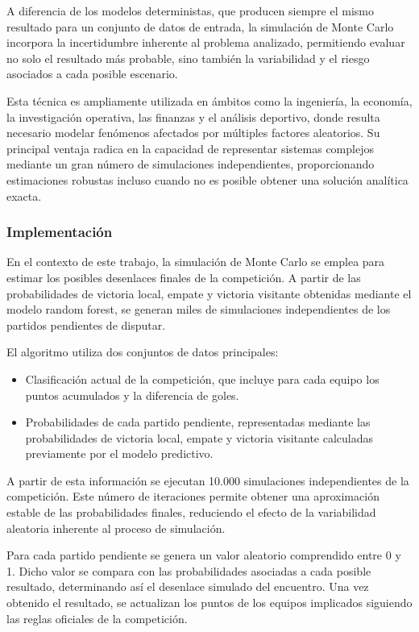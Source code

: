 A diferencia de los modelos deterministas, que producen siempre el mismo resultado para un conjunto de datos de entrada, la simulación de Monte Carlo incorpora la incertidumbre inherente al problema analizado, permitiendo evaluar no solo el resultado más probable, sino también la variabilidad y el riesgo asociados a cada posible escenario.

Esta técnica es ampliamente utilizada en ámbitos como la ingeniería, la economía, la investigación operativa, las finanzas y el análisis deportivo, donde resulta necesario modelar fenómenos afectados por múltiples factores aleatorios. Su principal ventaja radica en la capacidad de representar sistemas complejos mediante un gran número de simulaciones independientes, proporcionando estimaciones robustas incluso cuando no es posible obtener una solución analítica exacta.
\subsubsection{Implementación}

En el contexto de este trabajo, la simulación de Monte Carlo se emplea para estimar los posibles desenlaces finales de la competición. A partir de las probabilidades de victoria local, empate y victoria visitante obtenidas mediante el modelo random forest, se generan miles de simulaciones independientes de los partidos pendientes de disputar.

El algoritmo utiliza dos conjuntos de datos principales:

\begin{itemize}
\item Clasificación actual de la competición, que incluye para cada equipo los puntos acumulados y la diferencia de goles.
\item Probabilidades de cada partido pendiente, representadas mediante las probabilidades de victoria local, empate y victoria visitante calculadas previamente por el modelo predictivo.
\end{itemize}

A partir de esta información se ejecutan 10.000 simulaciones independientes de la competición. Este número de iteraciones permite obtener una aproximación estable de las probabilidades finales, reduciendo el efecto de la variabilidad aleatoria inherente al proceso de simulación.

Para cada partido pendiente se genera un valor aleatorio comprendido entre 0 y 1. Dicho valor se compara con las probabilidades asociadas a cada posible resultado, determinando así el desenlace simulado del encuentro. Una vez obtenido el resultado, se actualizan los puntos de los equipos implicados siguiendo las reglas oficiales de la competición.

